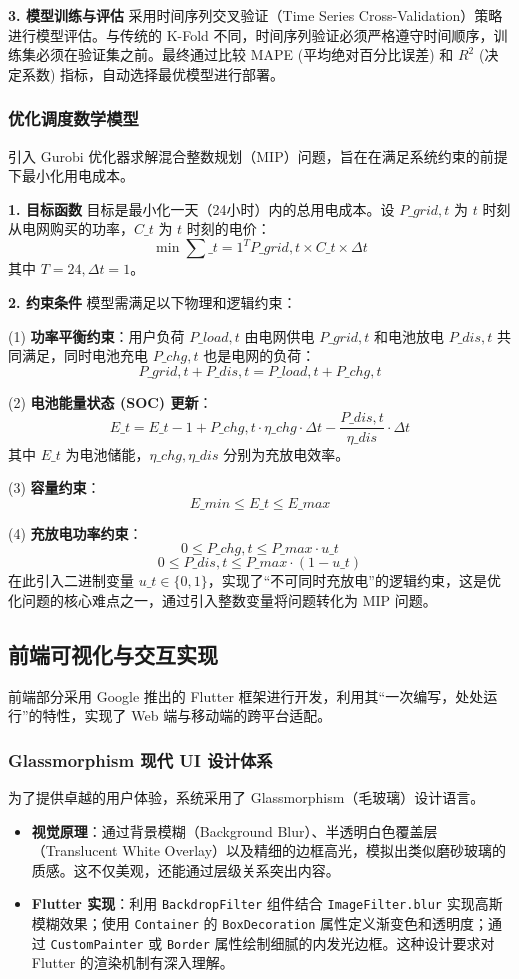 \textbf{3. 模型训练与评估}
采用时间序列交叉验证（Time Series Cross-Validation）策略进行模型评估。与传统的 K-Fold 不同，时间序列验证必须严格遵守时间顺序，训练集必须在验证集之前。最终通过比较 MAPE (平均绝对百分比误差) 和 $R^2$ (决定系数) 指标，自动选择最优模型进行部署。

\subsubsection{优化调度数学模型}
引入 Gurobi 优化器\cite{gurobi}求解混合整数规划（MIP）问题，旨在在满足系统约束的前提下最小化用电成本。

\textbf{1. 目标函数}
目标是最小化一天（24小时）内的总用电成本。设 $P\_{grid, t}$ 为 $t$ 时刻从电网购买的功率，$C\_t$ 为 $t$ 时刻的电价：
\[
    \min \sum\_{t=1}^{T} P\_{grid, t} \times C\_t \times \Delta t
\]
其中 $T=24, \Delta t=1$。

\textbf{2. 约束条件}
模型需满足以下物理和逻辑约束：

(1) \textbf{功率平衡约束}：用户负荷 $P\_{load, t}$ 由电网供电 $P\_{grid, t}$ 和电池放电 $P\_{dis, t}$ 共同满足，同时电池充电 $P\_{chg, t}$ 也是电网的负荷：
\[
    P\_{grid, t} + P\_{dis, t} = P\_{load, t} + P\_{chg, t}
\]

(2) \textbf{电池能量状态 (SOC) 更新}：
\[
    E\_{t} = E\_{t-1} + P\_{chg, t} \cdot \eta\_{chg} \cdot \Delta t - \frac{P\_{dis, t}}{\eta\_{dis}} \cdot \Delta t
\]
其中 $E\_t$ 为电池储能，$ \eta\_{chg}, \eta\_{dis} $ 分别为充放电效率。

(3) \textbf{容量约束}：
\[
    E\_{min} \le E\_t \le E\_{max}
\]

(4) \textbf{充放电功率约束}：
\[
    0 \le P\_{chg, t} \le P\_{max} \cdot u\_t
\]
\[
    0 \le P\_{dis, t} \le P\_{max} \cdot (1 - u\_t)
\]
在此引入二进制变量 $u\_t \in \{0, 1\}$，实现了“不可同时充放电”的逻辑约束，这是优化问题的核心难点之一，通过引入整数变量将问题转化为 MIP 问题。

\subsection{前端可视化与交互实现}

前端部分采用 Google 推出的 Flutter 框架\cite{flutter}进行开发，利用其“一次编写，处处运行”的特性，实现了 Web 端与移动端的跨平台适配。

\subsubsection{Glassmorphism 现代 UI 设计体系}
为了提供卓越的用户体验，系统采用了 Glassmorphism（毛玻璃）设计语言。
\begin{itemize}
    \item \textbf{视觉原理}：通过背景模糊（Background Blur）、半透明白色覆盖层（Translucent White Overlay）以及精细的边框高光，模拟出类似磨砂玻璃的质感。这不仅美观，还能通过层级关系突出内容。
    \item \textbf{Flutter 实现}：利用 \texttt{BackdropFilter} 组件结合 \texttt{ImageFilter.blur} 实现高斯模糊效果；使用 \texttt{Container} 的 \texttt{BoxDecoration} 属性定义渐变色和透明度；通过 \texttt{CustomPainter} 或 \texttt{Border} 属性绘制细腻的内发光边框。这种设计要求对 Flutter 的渲染机制有深入理解。
\end{itemize}

